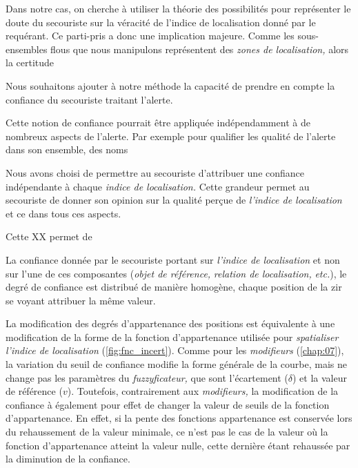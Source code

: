 Dans notre cas, on cherche à utiliser la théorie des possibilités pour
représenter le doute du secouriste sur la véracité de l'indice de
localisation donné par le requérant. Ce parti-pris a donc une
implication majeure. Comme les sous-ensembles flous que nous
manipulons représentent des \emph{zones de localisation,} alors la
certitude

Nous souhaitons ajouter à notre méthode la capacité de prendre en
compte la confiance du secouriste traitant l'alerte.

Cette notion de confiance pourrait être appliquée indépendamment à de
nombreux aspects de l'alerte. Par exemple pour qualifier les qualité
de l'alerte dans son ensemble, des noms 

Nous avons choisi de permettre au secouriste d'attribuer une confiance
indépendante à chaque \emph{indice de localisation.} Cette grandeur
permet au secouriste de donner son opinion sur la qualité perçue de
\emph{l'indice de localisation} et ce dans tous ces aspects.

Cette XX permet de 


La confiance donnée par le secouriste portant sur \emph{l'indice de
  localisation} et non sur l'une de ces composantes (\eg \emph{objet
  de référence,} \emph{relation de localisation,} \emph{etc.}), le
degré de confiance est distribué de manière homogène, chaque position
de la \ac{zir} se voyant attribuer la même valeur.


La modification des degrés d'appartenance des positions est
équivalente à une modification de la forme de la fonction
d'appartenance utilisée pour \emph{spatialiser l'indice de
  localisation} (\autoref{fig:fnc_incert}). Comme pour les
\emph{modifieurs} (\autoref{chap:07}), la variation du seuil de
confiance modifie la forme générale de la courbe, mais ne change pas
les paramètres du \emph{fuzzyficateur,} que sont l'écartement
(\(\delta\)) et la valeur de référence (\(v\)). Toutefois,
contrairement aux \emph{modifieurs,} la modification de la confiance à
également pour effet de changer la valeur de seuils de la fonction
d'appartenance. En effet, si la pente des fonctions appartenance est
conservée lors du rehaussement de la valeur minimale, ce n'est pas le
cas de la valeur où la fonction d'appartenance atteint la valeur
nulle, cette dernière étant rehaussée par la diminution de la
confiance.

